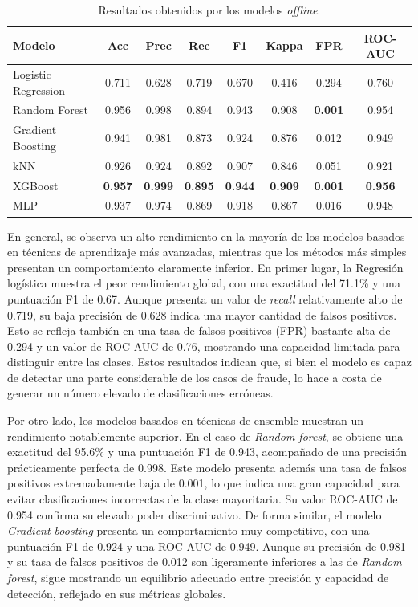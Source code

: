 \documentclass[12pt,a4paper]{report}
\begin{document}
\begin{table}[H]
\centering
\caption{Resultados obtenidos por los modelos \emph{offline}.}
\begin{tabular}{lccccccc}
\hline
\textbf{Modelo} & \textbf{Acc} & \textbf{Prec} & \textbf{Rec} & \textbf{F1} & \textbf{Kappa} & \textbf{FPR} & \textbf{ROC-AUC} \\
\hline
Logistic Regression & 0.711 & 0.628 & 0.719 & 0.670 & 0.416 & 0.294 & 0.760 \\
Random Forest & 0.956 & 0.998 & 0.894 & 0.943 & 0.908 & \textbf{0.001} & 0.954 \\
Gradient Boosting & 0.941 & 0.981 & 0.873 & 0.924 & 0.876 & 0.012 & 0.949 \\
kNN & 0.926 & 0.924 & 0.892 & 0.907 & 0.846 & 0.051 & 0.921 \\
XGBoost & \textbf{0.957} & \textbf{0.999} & \textbf{0.895} & \textbf{0.944} & \textbf{0.909} & \textbf{0.001} & \textbf{0.956} \\
MLP & 0.937 & 0.974 & 0.869 & 0.918 & 0.867 & 0.016 & 0.948 \\
\hline
\end{tabular}
\label{tab:resultados_offline}
\end{table}

En general, se observa un alto rendimiento en la mayoría de los modelos basados en técnicas de aprendizaje más avanzadas, mientras que los métodos más simples presentan un comportamiento claramente inferior. En primer lugar, la Regresión logística muestra el peor rendimiento global, con una exactitud del 71.1\% y una puntuación F1 de 0.67. Aunque presenta un valor de \emph{recall} relativamente alto de 0.719, su baja precisión de 0.628 indica una mayor cantidad de falsos positivos. Esto se refleja también en una tasa de falsos positivos (FPR) bastante alta de 0.294 y un valor de ROC-AUC de 0.76, mostrando una capacidad limitada para distinguir entre las clases. Estos resultados indican que, si bien el modelo es capaz de detectar una parte considerable de los casos de fraude, lo hace a costa de generar un número elevado de clasificaciones erróneas.

Por otro lado, los modelos basados en técnicas de ensemble muestran un rendimiento notablemente superior. En el caso de \emph{Random forest}, se obtiene una exactitud del 95.6\% y una puntuación F1 de 0.943, acompañado de una precisión prácticamente perfecta de 0.998. Este modelo presenta además una tasa de falsos positivos extremadamente baja de 0.001, lo que indica una gran capacidad para evitar clasificaciones incorrectas de la clase mayoritaria. Su valor ROC-AUC de 0.954 confirma su elevado poder discriminativo. De forma similar, el modelo \emph{Gradient boosting} presenta un comportamiento muy competitivo, con una puntuación F1 de 0.924 y una ROC-AUC de 0.949. Aunque su precisión de 0.981 y su tasa de falsos positivos de 0.012 son ligeramente inferiores a las de \emph{Random forest}, sigue mostrando un equilibrio adecuado entre precisión y capacidad de detección, reflejado en sus métricas globales.
\end{document}
